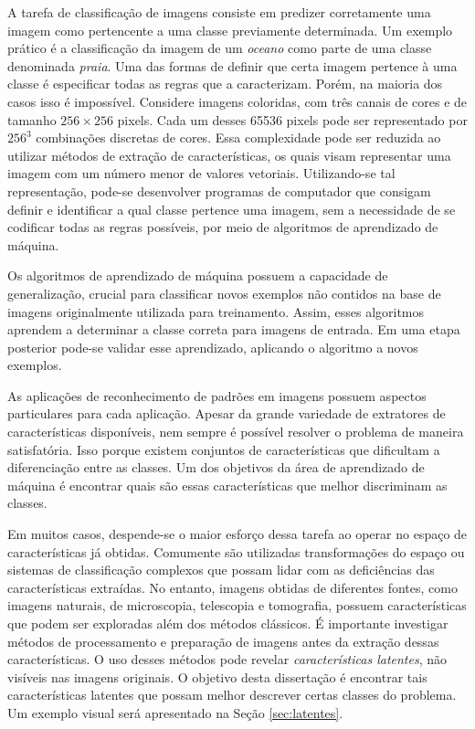 A tarefa de classificação de imagens consiste em predizer corretamente uma imagem como pertencente a uma classe previamente determinada.
Um exemplo prático é a classificação da imagem de um \textit{oceano} como parte de uma classe denominada \textit{praia}.
Uma das formas de definir que certa imagem pertence à uma classe é especificar todas as regras que a caracterizam. Porém, na maioria dos casos isso é impossível. Considere imagens coloridas, com três canais de cores e de tamanho $256\times256$ pixels. Cada um desses 65536 pixels pode ser representado por $256^3$ combinações discretas de cores. Essa complexidade pode ser reduzida ao utilizar métodos de extração de características, os quais visam representar uma imagem com um número menor de valores vetoriais. Utilizando-se tal representação, pode-se desenvolver programas de computador que consigam definir e identificar a qual classe pertence uma imagem, sem a necessidade de se codificar todas as regras possíveis, por meio de algoritmos de aprendizado de máquina.

Os algoritmos de aprendizado de máquina possuem a capacidade de generalização, crucial para classificar novos exemplos não contidos na base de imagens originalmente utilizada para treinamento. Assim, esses algoritmos aprendem a determinar a classe correta para imagens de entrada. Em uma etapa posterior pode-se validar esse aprendizado, aplicando o algoritmo a novos exemplos.

As aplicações de reconhecimento de padrões em imagens possuem aspectos particulares para cada aplicação. Apesar da grande variedade de extratores de características disponíveis, nem sempre é possível resolver o problema de maneira satisfatória. Isso porque existem conjuntos de características que dificultam a diferenciação entre as classes. Um dos objetivos da área de aprendizado de máquina é encontrar quais são essas características que melhor discriminam as classes.

Em muitos casos, despende-se o maior esforço dessa tarefa ao operar no espaço de características já obtidas. Comumente são utilizadas transformações do espaço ou sistemas de classificação complexos que possam lidar com as deficiências das características extraídas. No entanto, imagens obtidas de diferentes fontes, como imagens naturais, de microscopia, telescopia e tomografia, possuem características que podem ser exploradas além dos métodos clássicos. É importante investigar métodos de processamento e preparação de imagens antes da extração dessas características. O uso desses métodos pode revelar \textit{características latentes}, não visíveis nas imagens originais. O objetivo desta dissertação é encontrar tais características latentes que possam melhor descrever certas classes do problema. Um exemplo visual será apresentado na Seção \ref{sec:latentes}.


